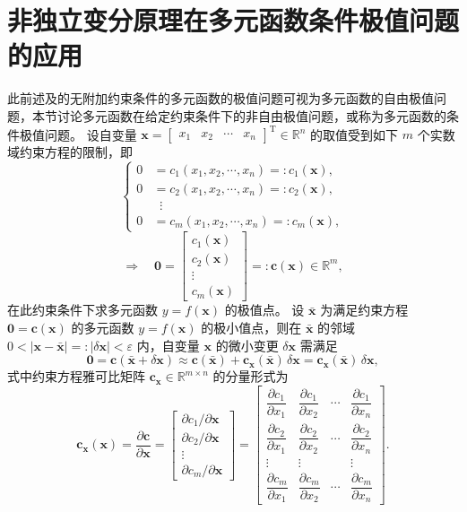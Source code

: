 \section{非独立变分原理在多元函数条件极值问题的应用}
此前述及的无附加约束条件的多元函数的极值问题可视为多元函数的自由极值问题，本节讨论多元函数在给定约束条件下的非自由极值问题，或称为多元函数的条件极值问题。
设自变量 $\boldsymbol{x}=\begin{bmatrix}x_1&x_2&\cdots&x_n\end{bmatrix}^{\mathrm{T}}\in\mathbb{R}^n$ 的取值受到如下 $m$ 个实数域约束方程的限制，即
\[
\left\{
\begin{aligned}
0&=c_1(x_1,x_2,\cdots,x_n)=:c_1(\boldsymbol{x}),\\
0&=c_2(x_1,x_2,\cdots,x_n)=:c_2(\boldsymbol{x}),\\
&\;\;\vdots\\
0&=c_m(x_1,x_2,\cdots,x_n)=:c_m(\boldsymbol{x}),
\end{aligned}
\right.
\]
\[
\Rightarrow\quad\boldsymbol{0}=\begin{bmatrix}c_1(\boldsymbol{x})\\c_2(\boldsymbol{x})\\\vdots\\c_m(\boldsymbol{x})\end{bmatrix}=:\boldsymbol{c}(\boldsymbol{x})\in\mathbb{R}^m,
\]
在此约束条件下求多元函数 $y=f(\boldsymbol{x})$ 的极值点。
设 $\bar{\boldsymbol{x}}$ 为满足约束方程 $\boldsymbol{0}=\boldsymbol{c}(\boldsymbol{x})$ 的多元函数 $y=f(\boldsymbol{x})$ 的极小值点，则在 $\bar{\boldsymbol{x}}$ 的邻域 $0<|\boldsymbol{x}-\bar{\boldsymbol{x}}|=:|\delta\boldsymbol{x}|<\varepsilon$ 内，自变量 $\boldsymbol{x}$ 的微小变更 $\delta\boldsymbol{x}$ 需满足
\[
\boldsymbol{0}=\boldsymbol{c}(\bar{\boldsymbol{x}}+\delta\boldsymbol{x})\approx\boldsymbol{c}(\bar{\boldsymbol{x}})+\boldsymbol{c}_{\boldsymbol{x}}(\bar{\boldsymbol{x}})\,\delta\boldsymbol{x}=\boldsymbol{c}_{\boldsymbol{x}}(\bar{\boldsymbol{x}})\,\delta\boldsymbol{x},
\]
式中约束方程雅可比矩阵 $\boldsymbol{c}_{\boldsymbol{x}}\in\mathbb{R}^{m\times n}$ 的分量形式为
\[
\boldsymbol{c}_{\boldsymbol{x}}(\boldsymbol{x})=\frac{\partial\boldsymbol{c}}{\partial\boldsymbol{x}}=\begin{bmatrix}\partial c_1/\partial\boldsymbol{x}\\\partial c_2/\partial\boldsymbol{x}\\\vdots\\\partial c_m/\partial\boldsymbol{x}\end{bmatrix}=\begin{bmatrix}\dfrac{\partial c_1}{\partial x_1}&\dfrac{\partial c_1}{\partial x_2}&\cdots&\dfrac{\partial c_1}{\partial x_n}\\\dfrac{\partial c_2}{\partial x_1}&\dfrac{\partial c_2}{\partial x_2}&\cdots&\dfrac{\partial c_2}{\partial x_n}\\\vdots&\vdots&&\vdots\\\dfrac{\partial c_m}{\partial x_1}&\dfrac{\partial c_m}{\partial x_2}&\cdots&\dfrac{\partial c_m}{\partial x_n}\end{bmatrix}.
\]
